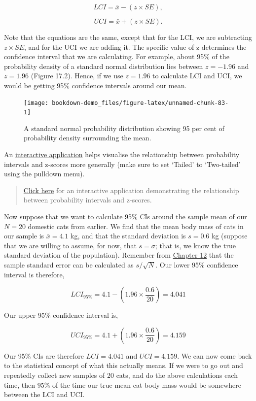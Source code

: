 \documentclass[
]{scrbook}
\begin{document}
\[LCI = \bar{x} - (z \times SE),\]

\[UCI = \bar{x} + (z \times SE).\]

Note that the equations are the same, except that for the LCI, we are subtracting \(z \times SE\), and for the UCI we are adding it.
The specific value of z determines the confidence interval that we are calculating.
For example, about 95\% of the probability density of a standard normal distribution lies between \(z = -1.96\) and \(z = 1.96\) (Figure 17.2).
Hence, if we use \(z = 1.96\) to calculate LCI and UCI, we would be getting 95\% confidence intervals around our mean.

\begin{figure}
\texttt{[image: bookdown-demo\_files/figure-latex/unnamed-chunk-83-1]} \caption{A standard normal probability distribution showing 95 per cent of probability density surrounding the mean.}\label{fig:unnamed-chunk-83}
\end{figure}

An \href{https://bradduthie.shinyapps.io/zandp/}{interactive application} helps visualise the relationship between probability intervals and z-scores more generally (make sure to set `Tailed' to `Two-tailed' using the pulldown menu).

\begin{quote}
\href{https://bradduthie.shinyapps.io/zandp/}{Click here} for an interactive application demonstrating the relationship between probability intervals and z-scores.
\end{quote}

Now suppose that we want to calculate 95\% CIs around the sample mean of our \(N = 20\) domestic cats from earlier.
We find that the mean body mass of cats in our sample is \(\bar{x} = 4.1\) kg, and that the standard deviation is \(s = 0.6\) kg (suppose that we are willing to assume, for now, that \(s = \sigma\); that is, we know the true standard deviation of the population).
Remember from \protect\hyperlink{Chapter_12}{Chapter 12} that the sample standard error can be calculated as \(s / \sqrt{N}\).
Our lower 95\% confidence interval is therefore,

\[LCI_{95\%} = 4.1 - \left(1.96 \times \frac{0.6}{20}\right) = 4.041\]

Our upper 95\% confidence interval is,

\[UCI_{95\%} = 4.1 + \left(1.96 \times \frac{0.6}{20}\right) = 4.159\]

Our 95\% CIs are therefore \(LCI = 4.041\) and \(UCI = 4.159\).
We can now come back to the statistical concept of what this actually means.
If we were to go out and repeatedly collect new samples of 20 cats, and do the above calculations each time, then 95\% of the time our true mean cat body mass would be somewhere between the LCI and UCI.
\end{document}
